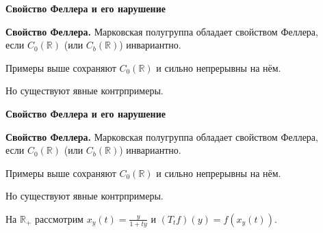 \documentclass[11pt]{article}
\newcommand{\R}{\mathbb{R}}
\begin{document}
\begin{center}
{\color{notaeYELLOW}\bfseries\fontsize{44}{52}\selectfont Свойство Феллера и его нарушение}
\end{center}
\vspace*{\fill}
\begin{center}
\fontsize{36}{43}\selectfont
\parbox{\linewidth}{\centering\noindent \textbf{Свойство Феллера.} Марковская полугруппа обладает свойством Феллера,\\ если $C_0(\R)$ (или $C_b(\R)$) инвариантно.
\par}\vspace{0.4in}
\parbox{\linewidth}{\centering\noindent Примеры выше сохраняют $C_0(\R)$ и сильно непрерывны на нём.
\par}\vspace{0.4in}
\parbox{\linewidth}{\centering\noindent Но существуют явные контрпримеры.
\par}\vspace{0.4in}
\end{center}
\vspace*{\fill}

\newpage

\begin{center}
{\color{notaeYELLOW}\bfseries\fontsize{44}{52}\selectfont Свойство Феллера и его нарушение}
\end{center}
\vspace*{\fill}
\begin{center}
\fontsize{36}{43}\selectfont
\parbox{\linewidth}{\centering\noindent \textbf{Свойство Феллера.} Марковская полугруппа обладает свойством Феллера,\\ если $C_0(\R)$ (или $C_b(\R)$) инвариантно.
\par}\vspace{0.4in}
\parbox{\linewidth}{\centering\noindent Примеры выше сохраняют $C_0(\R)$ и сильно непрерывны на нём.
\par}\vspace{0.4in}
\parbox{\linewidth}{\centering\noindent Но существуют явные контрпримеры.
\par}\vspace{0.4in}
\parbox{\linewidth}{\centering\noindent На $\R_+$ рассмотрим $x_y(t)=\frac{y}{1+ty}$ и $(T_t f)(y)=f(x_y(t))$.
\par}\vspace{0.4in}
\end{center}
\vspace*{\fill}

\newpage
\end{document}

